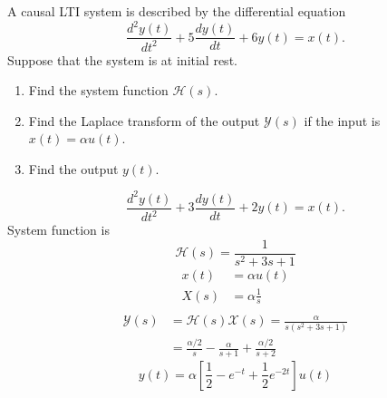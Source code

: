 \begin{frame}
    \begin{example}
        A causal LTI system is described by the differential equation
        \begin{equation*}
            \frac{d^2y(t)}{dt^2} + 5\frac{dy(t)}{dt} + 6y(t) = x(t).
        \end{equation*}
        Suppose that the system is at initial rest.
        \begin{enumerate}
            \item Find the system function $\mathcal{H}(s)$.
            \item Find the Laplace transform of the output $\mathcal{Y}(s)$ if the input is $x(t) = \alpha u(t)$.
            \item Find the output $y(t)$.
        \end{enumerate}
    \end{example}
\end{frame}





\begin{frame}
    {
        \begin{equation*}
            \frac{d^2y(t)}{dt^2} + 3\frac{dy(t)}{dt} + 2y(t) = x(t).
        \end{equation*}
        System function is
        \begin{equation*}
            \mathcal{H}(s) = \frac{1}{s^2 + 3s + 1}
        \end{equation*}
        \pause
        \begin{align*}
          x(t) &= \alpha u(t)\\
          X(s) &= \alpha \frac{1}{s}\\
        \end{align*}
        \pause
        \begin{equation*}
            \begin{split}
            \mathcal{Y}(s) &=  \mathcal{H}(s)\mathcal{X}(s) = \frac{\alpha}{s(s^2 + 3s + 1)}\\
            &= \frac{\alpha/2}{s} - \frac{\alpha}{s+1} +\frac{\alpha/2}{s+2}
            \end{split}
        \end{equation*}
        \pause
        \begin{equation*}
            y(t) = \alpha \left[ \frac{1}{2} - e^{-t} + \frac{1}{2}e^{-2t}\right]u(t)
        \end{equation*}

    }
\end{frame}

